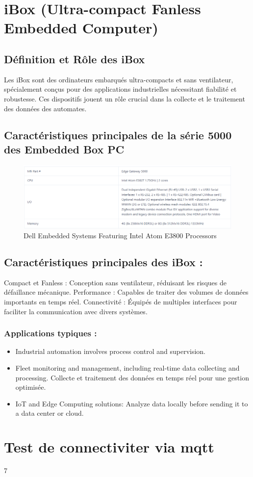 \section{iBox (Ultra-compact Fanless Embedded Computer)}
\subsection{Définition et Rôle des iBox} 
Les iBox sont des ordinateurs embarqués ultra-compacts et sans ventilateur, spécialement conçus pour des applications industrielles nécessitant fiabilité et robustesse. Ces dispositifs jouent un rôle crucial dans la collecte et le traitement des données des automates.
\subsection{Caractéristiques principales de la série 5000 des Embedded Box PC}

\begin{figure}[H]
    \centering
    \includegraphics[width=1.1\textwidth]{chapters/5/img/DELLLL.png}
    \caption{Dell Embedded Systems Featuring Intel Atom E3800 Processors}
    \label{fig:campus}
\end{figure}

\subsection{Caractéristiques principales des iBox :}

Compact et Fanless : Conception sans ventilateur, réduisant les risques de défaillance mécanique.
Performance : Capables de traiter des volumes de données importants en temps réel.
Connectivité : Équipés de multiples interfaces pour faciliter la communication avec divers systèmes.
\subsubsection{Applications typiques :}
\begin{itemize}
    \item  Industrial automation involves process control and supervision.
    \item  Fleet monitoring and management, including real-time data collecting and processing. Collecte et traitement des données en temps réel pour une gestion optimisée.
    \item IoT and Edge Computing solutions: Analyze data locally before sending it to a data center or cloud.
\end{itemize}


\section{Test de connectiviter via mqtt }7